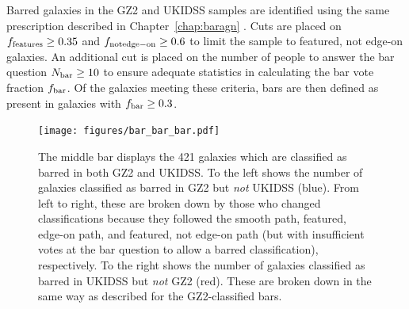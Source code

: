 Barred galaxies in the GZ2 and UKIDSS samples are identified using the same prescription described in Chapter~\ref{chap:baragn} \citep{Galloway2015}. Cuts are placed on $f_{\rm features} \ge 0.35$ and $f_{\rm not edge-on} \ge 0.6$ to limit the sample to featured, not edge-on galaxies. An additional cut is placed on the number of people to answer the bar question $N_{\rm bar}\ge 10$ to ensure adequate statistics in calculating the bar vote fraction $f_{\rm bar}$. Of the galaxies meeting these criteria, bars are then defined as present in galaxies with $f_{\rm bar}\ge 0.3$.  



\begin{figure}
\centering
\texttt{[image: figures/bar\_bar\_bar.pdf]}
\caption{The middle bar displays the 421 galaxies which are classified as barred in both GZ2 and UKIDSS. To the left shows the number of galaxies classified as barred in GZ2 but \emph{not} UKIDSS (blue). From left to right, these are broken down by those who changed classifications because they followed the smooth path, featured, edge-on path, and featured, not edge-on path (but with insufficient votes at the bar question to allow a barred classification), respectively. To the right shows the number of galaxies classified as barred in UKIDSS but \emph{not} GZ2 (red). These are broken down in the same way as described for the GZ2-classified bars. }
\label{fig:barbarbar}
\end{figure}

